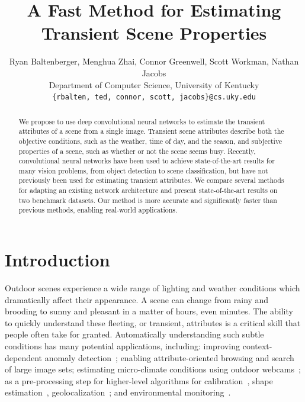 \documentclass[10pt,twocolumn,letterpaper]{article}
\begin{document}
\title{A Fast Method for Estimating Transient Scene Properties}


\author{Ryan Baltenberger, Menghua Zhai, Connor Greenwell, Scott Workman, Nathan Jacobs \\
  \vspace{-.75em} 
  Department of Computer Science, University of Kentucky \\
  {\tt\small \{rbalten, ted, connor, scott, jacobs\}@cs.uky.edu}
}

\maketitle
\ifwacvfinal\thispagestyle{empty}\fi


\begin{abstract}

We propose to use deep convolutional neural networks to estimate the transient
attributes of a scene from a single image.  Transient scene attributes describe
both the objective conditions, such as the weather, time of day, and the
season, and subjective properties of a scene, such as whether or not the scene
seems busy. Recently, convolutional neural networks have been used to achieve
state-of-the-art results for many vision problems, from object detection to
scene classification, but have not previously been used for estimating
transient attributes. We compare several methods for adapting an existing
network architecture and present state-of-the-art results on two benchmark
datasets. Our method is more accurate and significantly faster than previous
methods, enabling real-world applications. 

\end{abstract}

\section{Introduction}
Outdoor scenes experience a wide range of lighting and weather conditions which
dramatically affect their appearance. A scene can change from rainy and
brooding to sunny and pleasant in a matter of hours, even minutes. The ability
to quickly understand these fleeting, or transient, attributes is a critical
skill that people often take for granted. Automatically understanding such
subtle conditions has many potential applications, including: improving
context-dependent anomaly detection~\cite{abrams12lost}; enabling
attribute-oriented browsing and search of large image
sets\cite{jacobs07amos,skyfinder}; estimating micro-climate conditions using
outdoor webcams~\cite{islam13webcamweather}; as a pre-processing step for
higher-level algorithms for
calibration~\cite{jacobs13cloudcalibration,workman2014rainbow}, shape
estimation~\cite{heliometric,abramsheliometric},
geolocalization~\cite{jacobs07geolocate}; and  environmental
monitoring~\cite{jacobs09webcamgis}. 
\end{document}
